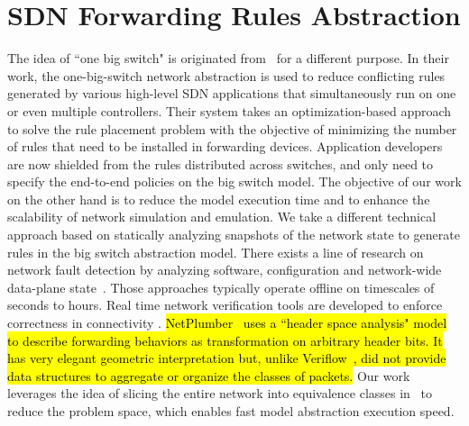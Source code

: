 \section{SDN Forwarding Rules Abstraction}
\label{OBS:Sec:RelatedWorks}

The idea of ``one big switch" is originated from~\mbox{\cite{OneBigSwitchAbstraction}} for a different purpose.
In their work, the one-big-switch network abstraction is used to reduce conflicting rules generated by
various high-level SDN applications that simultaneously run on one or even multiple controllers.
Their system takes an optimization-based approach to solve the rule placement problem with
the objective of minimizing the number of rules that need to be installed in forwarding devices.
Application developers are now shielded from the rules distributed across switches, and only need to specify the end-to-end policies on the big switch model. 
The objective of our work on the other hand is to reduce the model execution time and to
enhance the scalability of network simulation and emulation.
We take a different technical approach based on statically analyzing snapshots of the network state to generate rules in the big switch abstraction model.
There exists a line of research on network fault detection by analyzing software,
configuration and network-wide data-plane state~\cite{Al-Shaer2010,Al-Shaer2009,Anteater2011,xz+05}.
Those approaches typically operate offline on timescales of seconds to hours.
Real time network verification tools are developed to enforce correctness in connectivity \cite{NetPlumber2013,Veriflow}.
\hl{
    NetPlumber~\mbox{\cite{NetPlumber2013}} uses a ``header space analysis" model to
describe forwarding behaviors as transformation on arbitrary header bits.
It has very elegant geometric interpretation but, unlike Veriflow~\mbox{\cite{Veriflow}}, did not
provide data structures to aggregate or organize the classes of packets.
}
\fi
Our work leverages the idea of slicing the entire network into equivalence classes in~\cite{Veriflow}
to reduce the problem space, which enables fast model abstraction execution speed.

